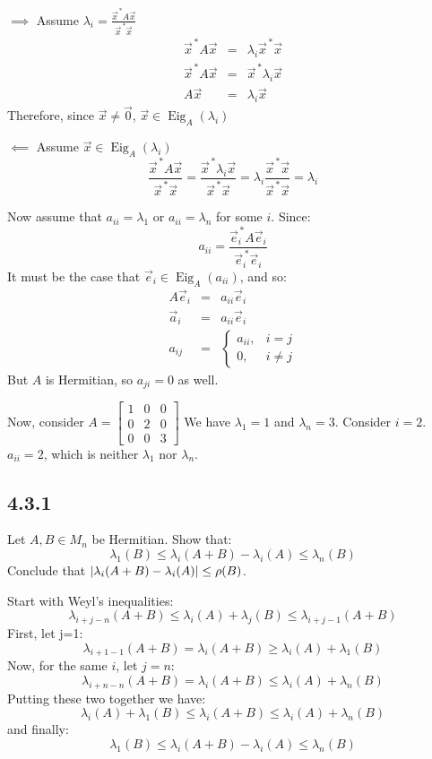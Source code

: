 \documentclass[letterpaper,12pt,fleqn]{article}
\renewcommand{\l}{\lambda}
\newcommand{\p}{\rho}
\newcommand{\vx}{\vec{x}}
\newcommand{\vxct}{\vx^{\,*}}
\newcommand{\rr}{\frac{\vxct A\vx}{\vxct\vx}}
\newcommand{\ve}{\vec{e}}
\newcommand{\vz}{\vec{0}}
\newcommand{\va}{\vec{a}}
\DeclareMathOperator{\Eig}{Eig}
\begin{document}
\begin{description}
\item $\implies$ Assume $\l_i=\rr$
  \begin{eqnarray*}
    \vxct A\vx &=& \l_i\vxct\vx \\
    \vxct A\vx &=& \vxct\l_i\vx \\
    A\vx &=& \l_i\vx
  \end{eqnarray*}
  Therefore, since $\vx\ne\vz$, $\vx\in\Eig_A(\l_i)$

\item $\impliedby$ Assume $\vx\in\Eig_A(\l_i)$
  \[\rr=\frac{\vxct\l_i\vx}{\vxct\vx}=\l_i\frac{\vxct\vx}{\vxct\vx}=\l_i\]
\end{description}

Now assume that $a_{ii}=\l_1$ or $a_{ii}=\l_n$ for some $i$. Since:
\[a_{ii}=\frac{\ve_i^{\,*}A\ve_i}{\ve_i^{\,*}\ve_i}\]
It must be the case that $\ve_i\in\Eig_A(a_{ii})$, and so:
\begin{eqnarray*}
  A\ve_i &=& a_{ii}\ve_i \\
  \va_i &=& a_{ii}\ve_i \\
  a_{ij} &=& \begin{cases} a_{ii}, & i=j \\ 0, & i\ne j \end{cases}
\end{eqnarray*}
But $A$ is Hermitian, so $a_{ji}=0$ as well.

Now, consider $A=\begin{bmatrix} 1 & 0 & 0 \\ 0 & 2 & 0 \\ 0 & 0 & 3 \end{bmatrix}$
We have $\l_1=1$ and $\l_n=3$. Consider $i=2$. $a_{ii}=2$, which is neither $\l_1$
nor $\l_n$.

\subsection*{4.3.1}

Let $A,B\in M_n$ be Hermitian. Show that:
\[\l_1(B)\le\l_i(A+B)-\l_i(A)\le\l_n(B)\]
Conclude that $\abs{\l_i(A+B)-\l_i(A)}\le\p(B)$.

Start with Weyl's inequalities:
\[\l_{i+j-n}(A+B)\le\l_i(A)+\l_j(B)\le\l_{i+j-1}(A+B)\]
First, let j=1:
\[\l_{i+1-1}(A+B)=\l_i(A+B)\ge\l_i(A)+\l_1(B)\]
Now, for the same $i$, let $j=n$:
\[\l_{i+n-n}(A+B)=\l_i(A+B)\le\l_i(A)+\l_n(B)\]
Putting these two together we have:
\[\l_i(A)+\l_1(B)\le\l_i(A+B)\le\l_i(A)+\l_n(B)\]
and finally:
\[\l_1(B)\le\l_i(A+B)-\l_i(A)\le\l_n(B)\]
\end{document}
